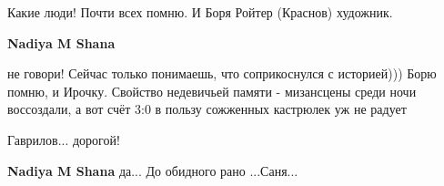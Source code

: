  
 
 
 
 

Какие люди! Почти всех помню. И Боря Ройтер (Краснов) художник.

\textbf{Nadiya M Shana} 

не говори! Сейчас только понимаешь, что соприкоснулся с историей))) Борю помню,
и Ирочку. Свойство недевичьей памяти - мизансцены среди ночи воссоздали, а вот
счёт 3:0 в пользу сожженных кастрюлек уж не радует

Гаврилов... дорогой!

\textbf{Nadiya M Shana} да... До обидного рано ...Саня...
